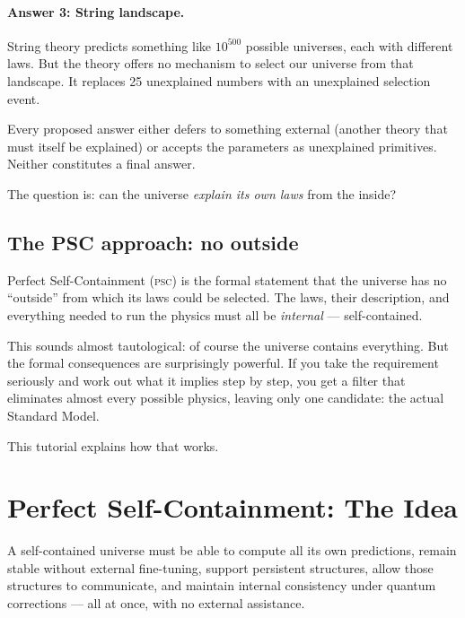 \documentclass[11pt,a4paper]{article}
\newcommand{\PSC}{\textsc{psc}}
\begin{document}
\paragraph{Answer 3: String landscape.}
String theory predicts something like $10^{500}$ possible universes, each with different
laws.  But the theory offers no mechanism to select our universe from that landscape.
It replaces 25 unexplained numbers with an unexplained selection event.

\medskip

\begin{tcolorbox}[colback=boxorange,colframe=orange!60!black,
  title=The key observation]
Every proposed answer either defers to something external (another theory that must
itself be explained) or accepts the parameters as unexplained primitives.
Neither constitutes a final answer.

The question is: can the universe \emph{explain its own laws} from the inside?
\end{tcolorbox}

\subsection{The PSC approach: no outside}

Perfect Self-Containment (\PSC) is the formal statement that the universe has no
``outside'' from which its laws could be selected.  The laws, their description, and
everything needed to run the physics must all be \emph{internal} — self-contained.

This sounds almost tautological: of course the universe contains everything.  But the
formal consequences are surprisingly powerful.  If you take the requirement seriously
and work out what it implies step by step, you get a filter that eliminates almost
every possible physics, leaving only one candidate: the actual Standard Model.

This tutorial explains how that works.

\section{Perfect Self-Containment: The Idea}
\label{sec:psc}

\begin{tcolorbox}[colback=boxblue,colframe=blue!40!black,
  title=One-sentence version of PSC]
A self-contained universe must be able to compute all its own predictions,
remain stable without external fine-tuning, support persistent structures,
allow those structures to communicate, and maintain internal consistency
under quantum corrections — all at once, with no external assistance.
\end{tcolorbox}
\end{document}
